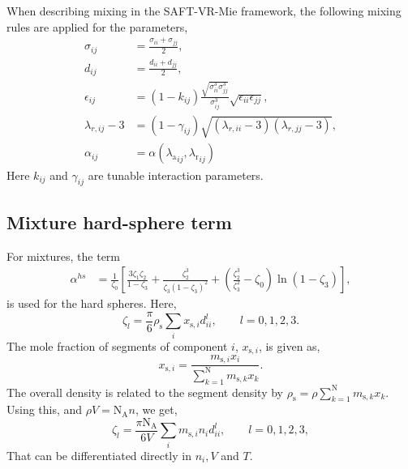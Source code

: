 \documentclass[english]{../thermomemo/thermomemo}
\newcommand*{\lb}{\left(}
\newcommand*{\rb}{\right)}
\newcommand{\seg}{\ensuremath{\text{s}}\xspace}
\newcommand{\lp}{\left(}
\newcommand{\rp}{\right)}
\newcommand{\lama}{\ensuremath{{\lambda_{\text{a}}}}\xspace}
\newcommand{\lamr}{\ensuremath{{\lambda_{\text{r}}}}\xspace}
\newcommand{\z}{\zeta}
\newcommand{\nc}{\ensuremath{\text{N}}\xspace}
\newcommand{\NA}{\ensuremath{\text{N}_{\text{A}}}\xspace}
\begin{document}
When describing mixing in the SAFT-VR-Mie framework, the following mixing rules are applied for the parameters,
\begin{align}
  \sigma_{ij} &= \frac{\sigma_{ii} + \sigma_{jj}}{2},\\
  d_{ij} &= \frac{d_{ii} + d_{jj}}{2},\\
  \epsilon_{ij} &= \lb 1-k_{ij}\rb\frac{\sqrt{\sigma_{ii}^3\sigma_{jj}^3}}{\sigma_{ij}^3} \sqrt{\epsilon_{ii}\epsilon_{jj}},\\
  \lambda_{r,ij} - 3 &= \lb 1-\gamma_{ij}\rb \sqrt{\lb \lambda_{r,ii} - 3\rb \lb \lambda_{r,jj} - 3\rb},\\
  \alpha_{ij} &=  \alpha\lb\lama_{ij},\lamr_{ij}\rb
\end{align}
Here $k_{ij}$ and $\gamma_{ij}$ are tunable interaction parameters.

\subsection{Mixture hard-sphere term}
For mixtures, the term
\begin{align}
  \alpha^{hs} &= \frac{1}{\z_0} \left[ \frac{3\z_1\z_2}{1-\z_3} + \frac{\z_2^3}{\z_3(1-\z_3)^2} + \lp \frac{\z_2^3}{\z_3^2} - \z_0 \rp \ln(1-\z_3) \right],
\end{align}
is used for the hard spheres. Here,
\begin{equation}
  \label{eq:z_l}
  \z_l = \frac{\pi}{6} \rho_\seg \sum_i x_{\seg,i} d_{ii}^l, \qquad l = 0,1,2,3.
\end{equation}
The mole fraction of segments of component $i$, $x_{\seg,i}$, is given as,
\begin{equation}
  \label{eq:x_s_i}
  x_{\seg,i} = \frac{m_{\seg,i} x_i}{\sum_{k=1}^\nc m_{\seg,k} x_k}.
\end{equation}
The overall density is related to the segment density by $\rho_\seg = \rho \sum_{k=1}^\nc m_{\seg,k} x_k$. Using this, and $\rho V = \NA n$, we get,
\begin{equation}
  \label{eq:z_l_n}
  \z_l = \frac{\pi \NA}{6 V} \sum_i m_{\seg,i} n_i d_{ii}^l, \qquad l = 0,1,2,3,
\end{equation}
That can be differentiated directly in $n_i, V$ and $T$.
\end{document}
